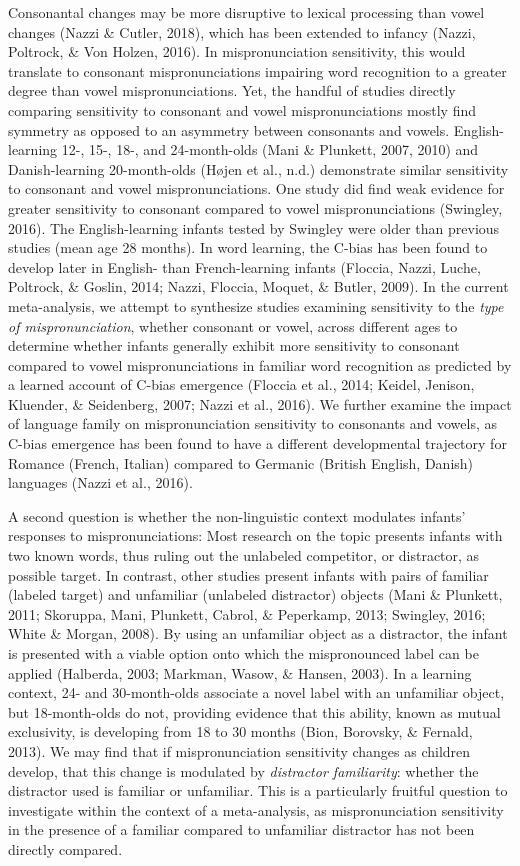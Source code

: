 \documentclass[man]{apa6}
\begin{document}
Consonantal changes may be more disruptive to lexical processing than vowel changes (Nazzi \& Cutler, 2018), which has been extended to infancy (Nazzi, Poltrock, \& Von Holzen, 2016). In mispronunciation sensitivity, this would translate to consonant mispronunciations impairing word recognition to a greater degree than vowel mispronunciations. Yet, the handful of studies directly comparing sensitivity to consonant and vowel mispronunciations mostly find symmetry as opposed to an asymmetry between consonants and vowels. English-learning 12-, 15-, 18-, and 24-month-olds (Mani \& Plunkett, 2007, 2010) and Danish-learning 20-month-olds (Højen et al., n.d.) demonstrate similar sensitivity to consonant and vowel mispronunciations. One study did find weak evidence for greater sensitivity to consonant compared to vowel mispronunciations (Swingley, 2016). The English-learning infants tested by Swingley were older than previous studies (mean age 28 months). In word learning, the C-bias has been found to develop later in English- than French-learning infants (Floccia, Nazzi, Luche, Poltrock, \& Goslin, 2014; Nazzi, Floccia, Moquet, \& Butler, 2009). In the current meta-analysis, we attempt to synthesize studies examining sensitivity to the \emph{type of mispronunciation}, whether consonant or vowel, across different ages to determine whether infants generally exhibit more sensitivity to consonant compared to vowel mispronunciations in familiar word recognition as predicted by a learned account of C-bias emergence (Floccia et al., 2014; Keidel, Jenison, Kluender, \& Seidenberg, 2007; Nazzi et al., 2016). We further examine the impact of language family on mispronunciation sensitivity to consonants and vowels, as C-bias emergence has been found to have a different developmental trajectory for Romance (French, Italian) compared to Germanic (British English, Danish) languages (Nazzi et al., 2016).

A second question is whether the non-linguistic context modulates infants' responses to mispronunciations: Most research on the topic presents infants with two known words, thus ruling out the unlabeled competitor, or distractor, as possible target. In contrast, other studies present infants with pairs of familiar (labeled target) and unfamiliar (unlabeled distractor) objects (Mani \& Plunkett, 2011; Skoruppa, Mani, Plunkett, Cabrol, \& Peperkamp, 2013; Swingley, 2016; White \& Morgan, 2008). By using an unfamiliar object as a distractor, the infant is presented with a viable option onto which the mispronounced label can be applied (Halberda, 2003; Markman, Wasow, \& Hansen, 2003). In a learning context, 24- and 30-month-olds associate a novel label with an unfamiliar object, but 18-month-olds do not, providing evidence that this ability, known as mutual exclusivity, is developing from 18 to 30 months (Bion, Borovsky, \& Fernald, 2013). We may find that if mispronunciation sensitivity changes as children develop, that this change is modulated by \emph{distractor familiarity}: whether the distractor used is familiar or unfamiliar. This is a particularly fruitful question to investigate within the context of a meta-analysis, as mispronunciation sensitivity in the presence of a familiar compared to unfamiliar distractor has not been directly compared.
\end{document}
